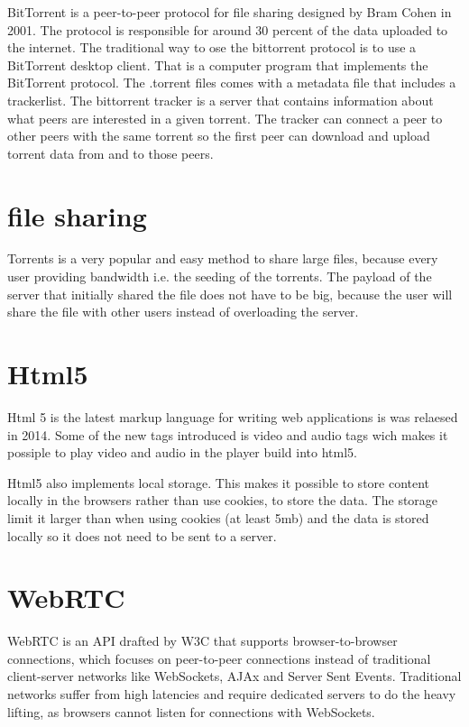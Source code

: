 BitTorrent is a peer-to-peer protocol for file sharing designed by Bram Cohen in 2001.
The protocol is responsible for around 30 percent of the data uploaded to the internet.
The traditional way to ose the bittorrent protocol is to use a BitTorrent desktop client. That is a computer program that implements the BitTorrent protocol.
The .torrent files comes with a metadata file that includes a trackerlist. The bittorrent tracker is a server that contains information about what peers are interested in a given torrent. The tracker can connect a peer to other peers with the same torrent so the first peer can download and upload torrent data from and to those peers.

\section{file sharing}
Torrents is a very popular and easy method to share large files, because every user providing bandwidth i.e. the seeding of the torrents.
The payload of the server that initially shared the file does not have to be big, because the user will share the file with other users instead of overloading the server.

\section{Html5}
Html 5 is the latest markup language for writing web applications is was relaesed in 2014. Some of the new tags introduced is video and audio tags wich makes it possiple to play video and audio in the player build into html5.

Html5 also implements local storage. This makes it possible to store content locally in the browsers rather than use cookies, to store the data.
The storage limit it larger than when using cookies (at least 5mb) and the data is stored locally so it does not need to be sent to a server.

\section{WebRTC}
WebRTC is an API drafted by W3C that supports browser-to-browser connections,
which focuses on peer-to-peer connections instead of traditional
client-server networks like WebSockets, AJAx and Server Sent Events.
Traditional networks suffer from high latencies and require dedicated servers to do the heavy lifting, 
as browsers cannot listen for connections with WebSockets.

